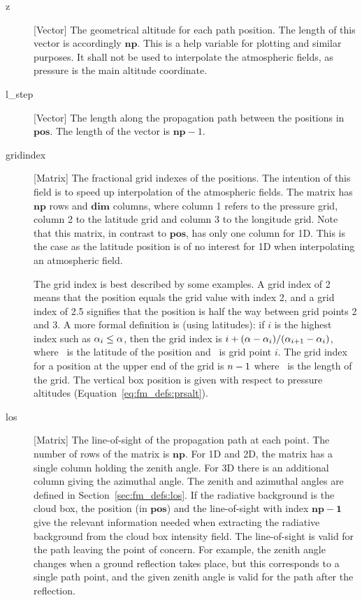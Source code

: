 \begin{description}
  \item[z] [Vector] The geometrical altitude for each path position. The
     length of this vector is accordingly $\mathbf{np}$. This is a help
     variable for plotting and similar purposes. It shall not be used to
     interpolate the atmospheric fields, as pressure is the main altitude
     coordinate.

  \item[l\_step] [Vector] The length along the propagation path between
     the positions in $\mathbf{pos}$. The length of the vector is
     $\mathbf{np}-1$. 

  \item[gridindex] [Matrix] The fractional grid indexes of the positions.
     The intention of this field is to speed up interpolation of the 
     atmospheric fields. The matrix has $\mathbf{np}$ rows and $\mathbf{dim}$ 
     columns, where column 1 refers to the pressure grid, column 2 to the 
     latitude grid and column 3 to the longitude grid. Note that this matrix,
     in contrast to $\mathbf{pos}$, has only one column for 1D. This is the 
     case as the latitude position is of no interest for 1D when interpolating
     an atmospheric field. 

     The grid index is best described by some examples. A grid index of
     2 means that the position equals the grid value with index 2, and
     a grid index of 2.5 signifies that the position is half the way between
     grid points 2 and 3. A more formal definition is (using latitudes):
     if $i$ is the highest index such as $\alpha_{i}\leq\alpha$, then the grid
     index is $i+(\alpha-\alpha_{i})/(\alpha_{i+1}-\alpha_{i})$, where \Lat\ is the 
     latitude of the position and \ is grid point $i$. The grid index 
     for a position at the upper end of the grid is $n-1$ where
     \VctLng\ is the length of the grid. The vertical box position is given 
     with respect to pressure altitudes (Equation~\ref{eq:fm_defs:prsalt}).
     
   \item[los] [Matrix] The line-of-sight of the propagation path at
     each point. The number of rows of the matrix is $\mathbf{np}$.
     For 1D and 2D, the matrix has a single column holding the zenith
     angle. For 3D there is an additional column giving the azimuthal
     angle. The zenith and azimuthal angles are defined in
     Section~\ref{sec:fm_defs:los}. If the radiative background is the
     cloud box, the position (in $\mathbf{pos}$) and the line-of-sight
     with index $\mathbf{np-1}$ give the relevant information needed
     when extracting the radiative background from the cloud box
     intensity field. The line-of-sight is valid for the path leaving
     the point of concern. For example, the zenith angle changes when
     a ground reflection takes place, but this corresponds to a single
     path point, and the given zenith angle is valid for the path after
     the reflection.
     

\end{description}
